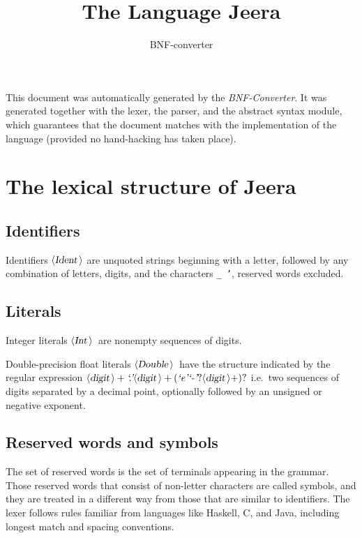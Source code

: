 \documentclass[a4paper,11pt]{article}
\author{BNF-converter}
\title{The Language Jeera}
\begin{document}
\maketitle

\newcommand{\emptyP}{\mbox{$\epsilon$}}
\newcommand{\terminal}[1]{\mbox{{\texttt {#1}}}}
\newcommand{\nonterminal}[1]{\mbox{$\langle \mbox{{\sl #1 }} \! \rangle$}}
\newcommand{\arrow}{\mbox{::=}}
\newcommand{\delimit}{\mbox{$|$}}
\newcommand{\reserved}[1]{\mbox{{\texttt {#1}}}}
\newcommand{\literal}[1]{\mbox{{\texttt {#1}}}}
\newcommand{\symb}[1]{\mbox{{\texttt {#1}}}}

This document was automatically generated by the {\em BNF-Converter}. It was generated together with the lexer, the parser, and the abstract syntax module, which guarantees that the document matches with the implementation of the language (provided no hand-hacking has taken place).

\section*{The lexical structure of Jeera}
\subsection*{Identifiers}
Identifiers \nonterminal{Ident} are unquoted strings beginning with a letter,
followed by any combination of letters, digits, and the characters {\tt \_ '},
reserved words excluded.


\subsection*{Literals}
Integer literals \nonterminal{Int}\ are nonempty sequences of digits.


Double-precision float literals \nonterminal{Double}\ have the structure
indicated by the regular expression $\nonterminal{digit}+ \mbox{{\it `.'}} \nonterminal{digit}+ (\mbox{{\it `e'}} \mbox{{\it `-'}}? \nonterminal{digit}+)?$ i.e.\
two sequences of digits separated by a decimal point, optionally
followed by an unsigned or negative exponent.




\subsection*{Reserved words and symbols}
The set of reserved words is the set of terminals appearing in the grammar. Those reserved words that consist of non-letter characters are called symbols, and they are treated in a different way from those that are similar to identifiers. The lexer follows rules familiar from languages like Haskell, C, and Java, including longest match and spacing conventions.
\end{document}
